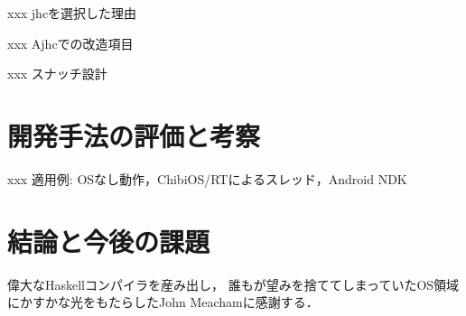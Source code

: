 \documentclass[submit,techreq,noauthor]{ipsj}
\begin{document}
xxx jhcを選択した理由

xxx Ajhcでの改造項目

xxx スナッチ設計

\section{開発手法の評価と考察}

xxx 適用例: OSなし動作，ChibiOS/RTによるスレッド，Android NDK

\section{結論と今後の課題}

\begin{acknowledgment}
偉大なHaskellコンパイラを産み出し，
誰もが望みを捨ててしまっていたOS領域にかすかな光をもたらしたJohn Meachamに感謝する．
\end{acknowledgment}




\begin{biography}
\end{biography}
\end{document}

